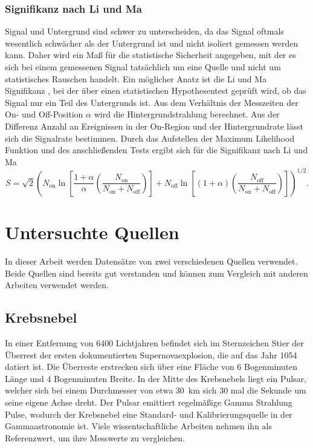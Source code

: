 \subsection*{Signifikanz nach Li und Ma}
Signal und Untergrund sind schwer zu unterscheiden, da das Signal oftmals wesentlich schwächer als der Untergrund ist und nicht isoliert gemessen werden kann. 
Daher wird ein Maß für die statistische Sicherheit angegeben, mit der es sich bei einem gemessenen Signal tatsächlich um eine Quelle und nicht um statistisches Rauschen handelt.
Ein möglicher Anatz ist die Li und Ma Signifikanz \cite{liandma}, bei der über einen statistischen Hypothesentest geprüft wird, ob das Signal nur ein Teil des Untergrunds ist. 
Aus dem Verhältnis der Messzeiten der On- und Off-Position $\alpha$ wird die Hintergrundstrahlung berechnet. 
Aus der Differenz Anzahl an Ereignissen in der On-Region und der Hintergrundrate lässt sich die Signalrate bestimmen. 
Durch das Aufstellen der Maximum Likelihood Funktion und des anschließenden Tests ergibt sich für die Signifikanz nach Li und Ma
\begin{equation}
S = \sqrt{2} \left( N_\text{on} \ln \left[ \frac{1+ \alpha}{\alpha}\left( \frac{N_\text{on}}{N_\text{on} + N_\text{off}} \right) \right] + N_\text{off} \ln \left[ \left( 1+ \alpha \right) \left( \frac{N_\text{off}}{N_\text{on} + N_\text{off}} \right) \right] \right)^{1/2}.
\end{equation}

\chapter{Untersuchte Quellen}
In dieser Arbeit werden Datensätze von zwei verschiedenen Quellen verwendet. 
Beide Quellen sind bereits gut verstanden und können zum Vergleich mit anderen Arbeiten verwendet werden.
\section{Krebsnebel}
In einer Entfernung von 6400 Lichtjahren befindet sich im Sternzeichen Stier der Überrest der ersten dokumentierten Supernovaexplosion, die auf das Jahr 1054 datiert ist. 
Die Überreste erstrecken sich über eine Fläche von 6 Bogenminuten Länge und 4 Bogenminuten Breite. 
In der Mitte des Krebsnebels liegt ein Pulsar, welcher sich bei einem Durchmesser von etwa \SI{30}{\kilo \meter} sich 30 mal die Sekunde um seine eigene Achse dreht.
Der Pulsar emittiert regelmäßige Gamma Strahlung Pulse, wodurch der Krebsnebel eine Standard- und Kalibrierungsquelle in der Gammaastronomie ist.
Viele wissentschaftliche Arbeiten nehmen ihn als Referenzwert, um ihre Messwerte zu vergleichen. 

